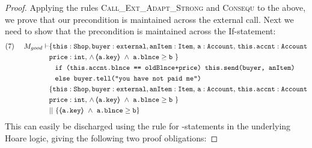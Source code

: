 \begin{proof}
Applying the rules \textsc{Call\_Ext\_Adapt\_Strong} and \textsc{Consequ} to the above, we prove that our precondition is maintained across the external call. 
Next we need to show that the precondition is maintained across the If-statement:
\small
\begin{align*}
\text{(7)}  \ \ \ \ M_{good} \vdash & \{  \prg{this}:\prg{Shop}, \prg{buyer} : \prg{external}, \prg{anItem} : \prg{Item},\, \prg{a}:\prg{Account},\, \prg{this.accnt}:\prg{Account}\\
				& \prg{price} : \prg{int},\,
				  \wedge\, 
				  \inside{\prg{a.key}}\ \wedge\ {\prg{a.blnce} \geq \prg{b}}\ \}\\
		  		&\;\;\; \prg{if (this.accnt.blnce == oldBlnce+price) this.send(buyer, anItem)}\ \\  
				&\;\;\;  \prg{else buyer.tell("you have not paid me")}\\
		  		&  \{  \prg{this}:\prg{Shop}, \prg{buyer} : \prg{external}, \prg{anItem} : \prg{Item},\, \prg{a}:\prg{Account},\, \prg{this.accnt}:\prg{Account}\\
				& \prg{price} : \prg{int},\,
				  \wedge\, 
				  \inside{\prg{a.key}}\ \wedge\ {\prg{a.blnce} \geq \prg{b}}\ \}\\ 
				& || \  \{ \inside{\prg{a.key}}\ \wedge\ {\prg{a.blnce} \geq \prg{b}} \}
\end{align*}
\normalsize
This can easily be discharged using the rule for -statements in the underlying Hoare logic, giving the following two proof obligations:

\end{proof}
